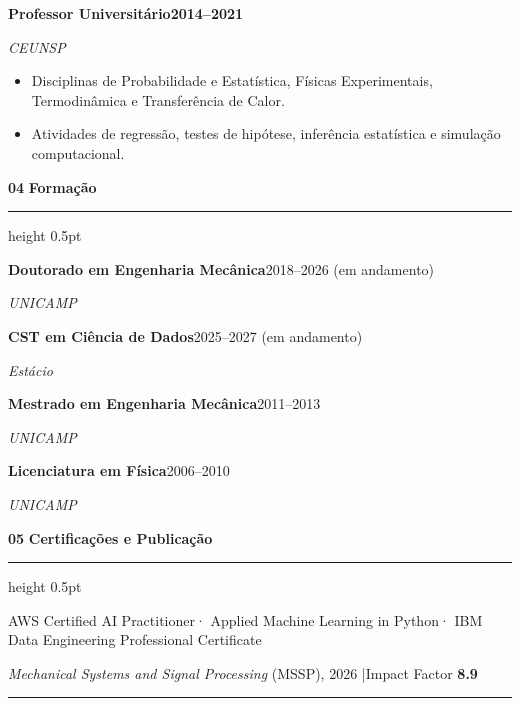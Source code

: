 \documentclass[10pt,a4paper]{article}
\newcommand{\cvsection}[2]{%
  \vspace{0.42em}
  {\footnotesize\bfseries\color{cvmuted}#1}\enspace
  {\large\bfseries\color{cvdark}#2}\par
  \vspace{0.04em}
  {\color{cvrule}\hrule height 0.5pt}
  \vspace{0.18em}
}
\newcommand{\entry}[4]{%
  \noindent\textbf{\color{cvdark}#1}\hfill{\small\bfseries\color{cvaccent}#2}\par
  {\small\itshape\color{cvmuted}#3}\par
  \vspace{0.04em}
  {\small #4}
  \vspace{0.12em}
}
\newcommand{\cvdegree}[3]{%
  \noindent\textbf{\color{cvdark}#1}\hfill{\small\color{cvaccent}#3}\par
  {\small\itshape\color{cvmuted}#2}\par
  \vspace{0.06em}
}
\begin{document}
\entry{Professor Universitário}{2014--2021}%
  {CEUNSP}{%
  \begin{itemize}
    \item Disciplinas de Probabilidade e Estatística, Físicas Experimentais, Termodinâmica e Transferência de Calor.
    \item Atividades de regressão, testes de hipótese, inferência estatística e simulação computacional.
  \end{itemize}
}

\cvsection{04}{Formação}
\cvdegree{Doutorado em Engenharia Mecânica}{UNICAMP}{2018--2026 (em andamento)}
\cvdegree{CST em Ciência de Dados}{Estácio}{2025--2027 (em andamento)}
\cvdegree{Mestrado em Engenharia Mecânica}{UNICAMP}{2011--2013}
\cvdegree{Licenciatura em Física}{UNICAMP}{2006--2010}

\cvsection{05}{Certificações e Publicação}
{\small
  AWS Certified AI Practitioner\enspace·\enspace
  Applied Machine Learning in Python\enspace·\enspace
  IBM Data Engineering Professional Certificate\par
  \vspace{0.06em}
  \textit{Mechanical Systems and Signal Processing} (MSSP), 2026
  \enspace|\enspace Impact Factor \textbf{\color{cvaccent}8.9}
}

\vspace{0.34em}
{\color{cvrule}\noindent\rule{\linewidth}{0.4pt}}\par
\end{document}
